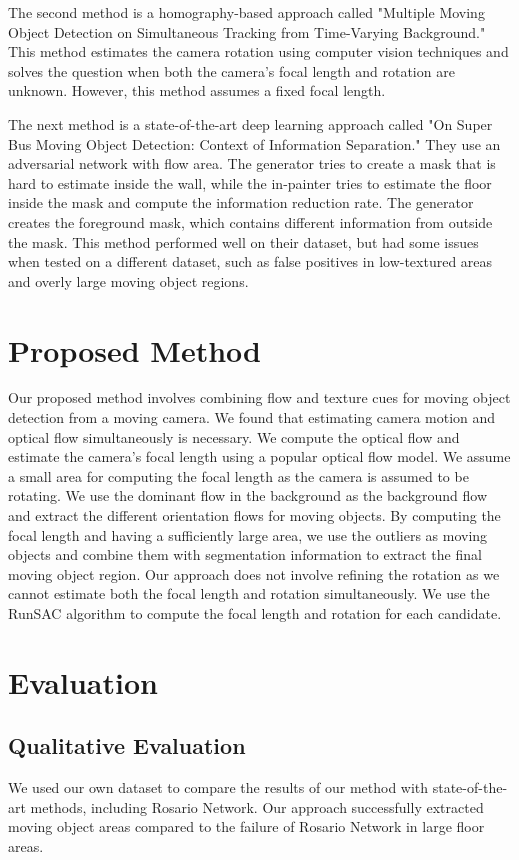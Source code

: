 \documentclass[10pt, twocolumn]{article}
\begin{document}
The second method is a homography-based approach called "Multiple Moving Object Detection on Simultaneous Tracking from Time-Varying Background." This method estimates the camera rotation using computer vision techniques and solves the question when both the camera's focal length and rotation are unknown. However, this method assumes a fixed focal length.

The next method is a state-of-the-art deep learning approach called "On Super Bus Moving Object Detection: Context of Information Separation." They use an adversarial network with flow area. The generator tries to create a mask that is hard to estimate inside the wall, while the in-painter tries to estimate the floor inside the mask and compute the information reduction rate. The generator creates the foreground mask, which contains different information from outside the mask. This method performed well on their dataset, but had some issues when tested on a different dataset, such as false positives in low-textured areas and overly large moving object regions.

\section{Proposed Method}
Our proposed method involves combining flow and texture cues for moving object detection from a moving camera. We found that estimating camera motion and optical flow simultaneously is necessary. We compute the optical flow and estimate the camera's focal length using a popular optical flow model. We assume a small area for computing the focal length as the camera is assumed to be rotating. We use the dominant flow in the background as the background flow and extract the different orientation flows for moving objects. By computing the focal length and having a sufficiently large area, we use the outliers as moving objects and combine them with segmentation information to extract the final moving object region. Our approach does not involve refining the rotation as we cannot estimate both the focal length and rotation simultaneously. We use the RunSAC algorithm to compute the focal length and rotation for each candidate.

\section{Evaluation}

\subsection{Qualitative Evaluation}
We used our own dataset to compare the results of our method with state-of-the-art methods, including Rosario Network. Our approach successfully extracted moving object areas compared to the failure of Rosario Network in large floor areas.
\end{document}
